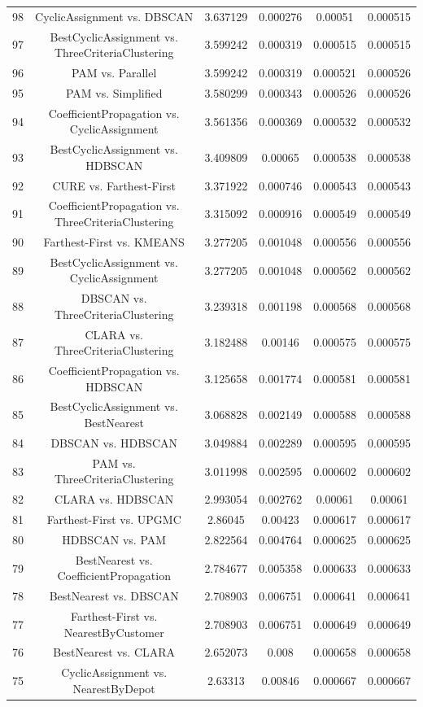 \documentclass[a4paper,10pt]{article}
\begin{document}
\begin{landscape}
\begin{table}[!htp]
\begin{tabular}{cccccc}
98&CyclicAssignment vs. DBSCAN&3.637129&0.000276&0.00051&0.000515\\
97&BestCyclicAssignment vs. ThreeCriteriaClustering&3.599242&0.000319&0.000515&0.000515\\
96&PAM vs. Parallel&3.599242&0.000319&0.000521&0.000526\\
95&PAM vs. Simplified&3.580299&0.000343&0.000526&0.000526\\
94&CoefficientPropagation vs. CyclicAssignment&3.561356&0.000369&0.000532&0.000532\\
93&BestCyclicAssignment vs. HDBSCAN&3.409809&0.00065&0.000538&0.000538\\
92&CURE vs. Farthest-First&3.371922&0.000746&0.000543&0.000543\\
91&CoefficientPropagation vs. ThreeCriteriaClustering&3.315092&0.000916&0.000549&0.000549\\
90&Farthest-First vs. KMEANS&3.277205&0.001048&0.000556&0.000556\\
89&BestCyclicAssignment vs. CyclicAssignment&3.277205&0.001048&0.000562&0.000562\\
88&DBSCAN vs. ThreeCriteriaClustering&3.239318&0.001198&0.000568&0.000568\\
87&CLARA vs. ThreeCriteriaClustering&3.182488&0.00146&0.000575&0.000575\\
86&CoefficientPropagation vs. HDBSCAN&3.125658&0.001774&0.000581&0.000581\\
85&BestCyclicAssignment vs. BestNearest&3.068828&0.002149&0.000588&0.000588\\
84&DBSCAN vs. HDBSCAN&3.049884&0.002289&0.000595&0.000595\\
83&PAM vs. ThreeCriteriaClustering&3.011998&0.002595&0.000602&0.000602\\
82&CLARA vs. HDBSCAN&2.993054&0.002762&0.00061&0.00061\\
81&Farthest-First vs. UPGMC&2.86045&0.00423&0.000617&0.000617\\
80&HDBSCAN vs. PAM&2.822564&0.004764&0.000625&0.000625\\
79&BestNearest vs. CoefficientPropagation&2.784677&0.005358&0.000633&0.000633\\
78&BestNearest vs. DBSCAN&2.708903&0.006751&0.000641&0.000641\\
77&Farthest-First vs. NearestByCustomer&2.708903&0.006751&0.000649&0.000649\\
76&BestNearest vs. CLARA&2.652073&0.008&0.000658&0.000658\\
75&CyclicAssignment vs. NearestByDepot&2.63313&0.00846&0.000667&0.000667\\

\end{tabular}
\end{table}
\end{landscape}
\end{document}
